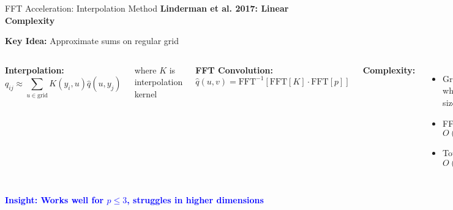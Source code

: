 \documentclass[aspectratio=169]{beamer}
\newcommand{\conceptbox}[2]{\colorbox{#1!20}{\textcolor{#1}{\textbf{#2}}}}
\newcommand{\insight}[1]{\conceptbox{blue}{Insight: #1}}
\begin{document}

\begin{frame}{FFT Acceleration: Interpolation Method}
\textbf{Linderman et al. 2017: Linear Complexity}

\textbf{Key Idea:} Approximate sums on regular grid

\begin{columns}
\textbf{Interpolation:}
$$q_{ij} \approx \sum_{u \in \text{grid}} K(y_i, u) \hat{q}(u, y_j)$$

where $K$ is interpolation kernel

\textbf{FFT Convolution:}
$$\hat{q}(u, v) = \text{FFT}^{-1}[\text{FFT}[K] \cdot \text{FFT}[p]]$$

\textbf{Complexity:}
\begin{itemize}
\item Grid: $O(m^p)$ where $m$ = grid size
\item FFT: $O(m^p \log m)$
\item Total: $O(n + m^p \log m)$
\end{itemize}

\begin{center}
\end{center}
\end{columns}

\insight{Works well for $p \leq 3$, struggles in higher dimensions}
\end{frame}
\end{document}
